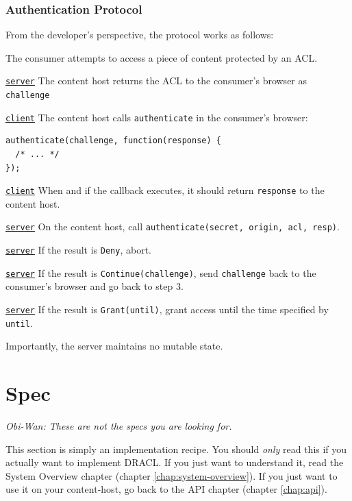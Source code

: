 \documentclass[pdftex,12pt,a4papaer,twoside,notitlepage]{report}
\begin{document}
\subsection{Authentication Protocol}

From the developer's perspective, the protocol works as follows:

\newcommand{\server}{\underline{\texttt{server}}}
\newcommand{\client}{\underline{\texttt{client}}}

\begin{compactenum}
\item The consumer attempts to access a piece of content protected by an ACL.
\item \server{} The content host returns the ACL to the consumer's browser as
  \texttt{challenge}
\item \client{} The content host calls \texttt{authenticate} in the
  consumer's browser:
  \begin{verbatim}
authenticate(challenge, function(response) {
  /* ... */
});
\end{verbatim}
\item \client{} When and if the callback executes, it should return
  \texttt{response} to the content host.
\item \server{} On the content host, call \verb=authenticate(secret, origin, acl, resp)=.
\item \server{} If the result is \texttt{Deny}, abort.
\item \server{} If the result is \texttt{Continue(challenge)}, send \texttt{challenge}
  back to the consumer's browser and go back to step 3.
\item \server{} If the result is \texttt{Grant(until)}, grant access until the
  time specified by \texttt{until}.
\end{compactenum}

Importantly, the server maintains no mutable state.

\chapter{Spec}

\emph{Obi-Wan: These are not the specs you are looking for.}

This section is simply an implementation recipe. You should \emph{only} read
this if you actually want to implement DRACL. If you just want to understand it,
read the System Overview chapter (chapter \ref{chap:system-overview}). If you
just want to use it on your content-host, go back to the API chapter (chapter
\ref{chap:api}).
\end{document}
